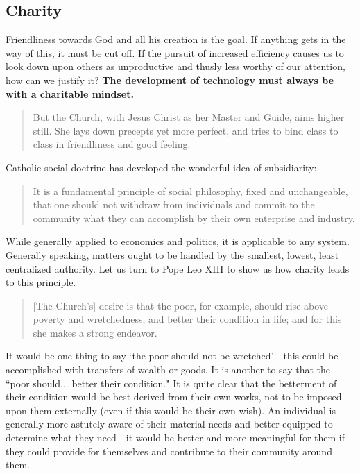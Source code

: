\documentclass[letterpaper]{article}
\begin{document}




\subsection{Charity}


Friendliness towards God and all his creation is the goal. If anything gets in the way of this, it must be cut off. If the pursuit of increased efficiency causes us to look down upon others as unproductive and thusly less worthy of our attention, how can we justify it? \textbf{The development of technology must always be with a charitable mindset.}

\begin{quote}
  But the Church, with Jesus Christ as her Master and Guide, aims higher still. She lays down precepts yet more perfect, and tries to bind class to class in friendliness and good feeling.
\end{quote}

Catholic social doctrine has developed the wonderful idea of subsidiarity:

\begin{quote}
  It is a fundamental principle of social philosophy, fixed and unchangeable, that one should not withdraw from individuals and commit to the community what they can accomplish by their own enterprise and industry.
\end{quote}

While generally applied to economics and politics, it is applicable to any system. Generally speaking, matters ought to be handled by the smallest, lowest, least centralized authority. Let us turn to Pope Leo XIII to show us how charity leads to this principle.

\begin{quote}
  [The Church's] desire is that the poor, for example, should rise above poverty and wretchedness, and better their condition in life; and for this she makes a strong endeavor.
\end{quote}

It would be one thing to say `the poor should not be wretched' - this could be accomplished with transfers of wealth or goods. It is another to say that the ``poor should... better their condition."  It is quite clear that the betterment of their condition would be best derived from their own works, not to be imposed upon them externally (even if this would be their own wish). An individual is generally more astutely aware of their material needs and better equipped to determine what they need - it would be better and more meaningful for them if they could provide for themselves and contribute to their community around them.
\end{document}
